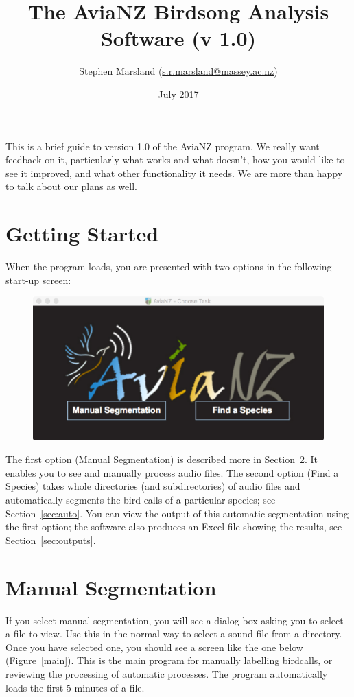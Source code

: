 \documentclass{article}
\title{The AviaNZ Birdsong Analysis Software (v 1.0)}
\author{Stephen Marsland (\url{s.r.marsland@massey.ac.nz})}
\date{July 2017}
\begin{document}
\maketitle


This is a brief guide to version 1.0 of the AviaNZ program. 
We really want feedback on it, particularly what works and what doesn't, how you would like to see it improved, and what other functionality it needs. We are more than happy to talk about our plans as well. 


\section{Getting Started}

When the program loads, you are presented with two options in the following start-up screen:

\begin{figure}[h!]
\centering
\includegraphics[width=.3\textwidth]{Figs/splashscreen}
\label{welcome}
\end{figure}

The first option (Manual Segmentation) is described more in Section~\ref{sec:manual}. It enables you to see and manually process audio files. The second option (Find a Species) takes whole directories (and subdirectories) of audio files and automatically segments the bird calls of a particular species; see Section~\ref{sec:auto}. You can view the output of this automatic segmentation using the first option; the software also produces an Excel file showing the results, see Section~\ref{sec:outputs}.  

\section{Manual Segmentation}
\label{sec:manual}

If you select manual segmentation, you will see a dialog box asking you to select a file to view. Use this in the normal way to select a sound file from a directory. Once you have selected one, you should see a screen like the one below (Figure~\ref{main}). This is the main program for manually labelling birdcalls, or reviewing the processing of automatic processes.
The program automatically loads the first 5 minutes of a file. 
\end{document}
